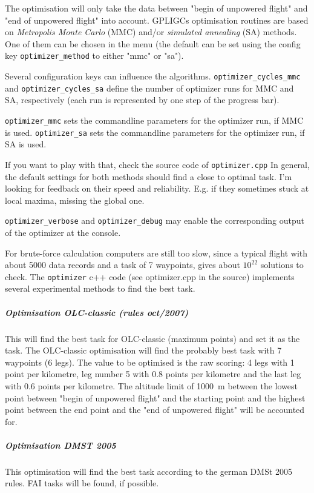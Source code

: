 The optimisation will only take the data between "begin of unpowered flight" and "end of unpowered flight" into account.
GPLIGCs optimisation routines are based on \emph{Metropolis Monte Carlo} (MMC) and/or \emph{simulated annealing} (SA) methods.
One of them can be chosen in the menu (the default can be set using the config key \texttt{optimizer\_method} to either "mmc" or "sa").

Several configuration keys can influence the algorithms.
\texttt{optimizer\_cycles\_mmc} and \texttt{optimizer\_cycles\_sa} define the number of optimizer runs for MMC and SA, respectively (each run is represented by one step of the progress bar).

\texttt{optimizer\_mmc} sets the commandline parameters for the optimizer run, if MMC is used.
\texttt{optimizer\_sa} sets the commandline parameters for the optimizer run, if SA is used.

If you want to play with that, check the source code of \texttt{optimizer.cpp}
In general, the default settings for both methods should find a close to optimal task. 
I'm looking for feedback on their speed and reliability. 
E.g. if they sometimes stuck at local maxima, missing the global one.

\texttt{optimizer\_verbose} and \texttt{optimizer\_debug} may enable the corresponding output of the optimizer at the console.

For brute-force calculation computers are still too slow, since a typical flight with about 5000 data records and a task of 7 waypoints, gives about $10^{22}$ solutions to check. The \texttt{optimizer} c++ code (see optimizer.cpp in the source) implements several experimental methods to find the best task.



\subparagraph{Optimisation OLC-classic (rules oct/2007)}
This will find the best task for OLC-classic (maximum points) and set it  as  the task.
The OLC-classic optimisation will find the probably best task with 7 waypoints (6 legs). The value to be optimised is the raw scoring: 4 legs with 1 point per kilometre, leg number 5 with 0.8 points per kilometre and the last leg with 0.6 points per kilometre. The altitude limit of 1000~m between the lowest point between "begin of unpowered flight" and the starting point and the highest point between the end point and the "end of unpowered flight" will be accounted  for.

\subparagraph{Optimisation DMST 2005}
This optimisation will find the best task according to the german DMSt 2005 rules. FAI tasks will be found, if possible.

